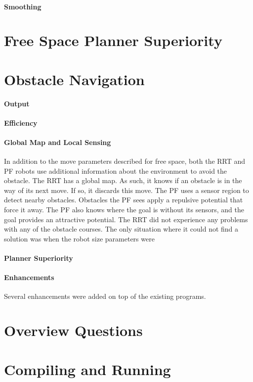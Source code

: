 \documentclass[12pt]{article}
\begin{document}
\paragraph*{Smoothing}
\section{Free Space Planner Superiority}


\section{Obstacle Navigation}
\paragraph*{Output}
\paragraph*{Efficiency}
\paragraph*{Global Map and Local Sensing}
In addition to the move parameters described for free space, both the RRT and PF robots use additional information about the environment to avoid the obstacle. The RRT has a global map. As such, it knows if an obstacle is in the way of its next move. If so, it discards this move. The PF uses a sensor region to detect nearby obstacles. Obstacles the PF sees apply a repulsive potential that force it away. The PF also knows where the goal is without its sensors, and the goal provides an attractive potential. The RRT did not experience any problems with any of the obstacle courses. The only situation where it could not find a solution was when the robot size parameters were 
\paragraph*{Planner Superiority}
\paragraph*{Enhancements}
Several enhancements were added on top of the existing programs. 
\section{Overview Questions}

\section{Compiling and Running}
\end{document}
